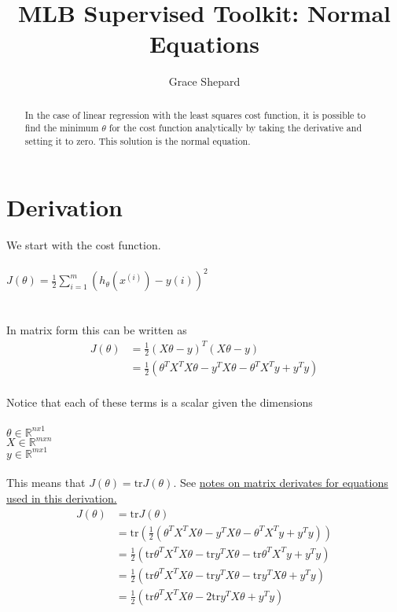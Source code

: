 \documentclass{article}
\begin{document}
\title{MLB Supervised Toolkit: Normal Equations}
\author{Grace Shepard}

\maketitle

\begin{abstract}
In the case of linear regression with the least squares cost function, it is possible to find the minimum $\theta$ for the cost function analytically by taking the derivative and setting it to zero. This solution is the normal equation.
\end{abstract}

\section{Derivation}
We start with the cost function.\\
\\
$J(\theta) = \frac{1}{2}\sum_{i=1}^m{(h_\theta(x^{(i)}) - y{(i)})}^2$\\ 
\\
\\
In matrix form this can be written as
\begin{align*}
J(\theta) &= \frac{1}{2}{(X\theta-y)}^T(X\theta - y)\\
 &= \frac{1}{2}(\theta^TX^TX\theta - y^TX\theta - \theta^TX^Ty+y^Ty)
\end{align*}
\\
Notice that each of these terms is a scalar given the dimensions\\
\\
$\theta \in \mathbb{R}^{nx1}$\\
$X \in \mathbb{R}^{mxn}$\\
$y \in \mathbb{R}^{mx1}$\\
\\
This means that $J(\theta)=\text{tr}J(\theta)$. See \href{../linalg/matrix-derivatives.pdf}{notes on matrix derivates for equations used in this derivation.}\\
\begin{align*}
J(\theta) &= \text{tr}J(\theta)\\
&= \text{tr}(\frac{1}{2}(\theta^TX^TX\theta - y^TX\theta - \theta^TX^Ty+y^Ty)) \\
&= \frac{1}{2}(\text{tr}\theta^TX^TX\theta - \text{tr}y^TX\theta - \text{tr}\theta^TX^Ty+y^Ty) \\
&= \frac{1}{2}(\text{tr}\theta^TX^TX\theta - \text{tr}y^TX\theta - \text{tr}y^TX\theta+y^Ty) \\
&= \frac{1}{2}(\text{tr}\theta^TX^TX\theta - 2\text{tr}y^TX\theta+y^Ty) \\
\end{align*}
\end{document}
